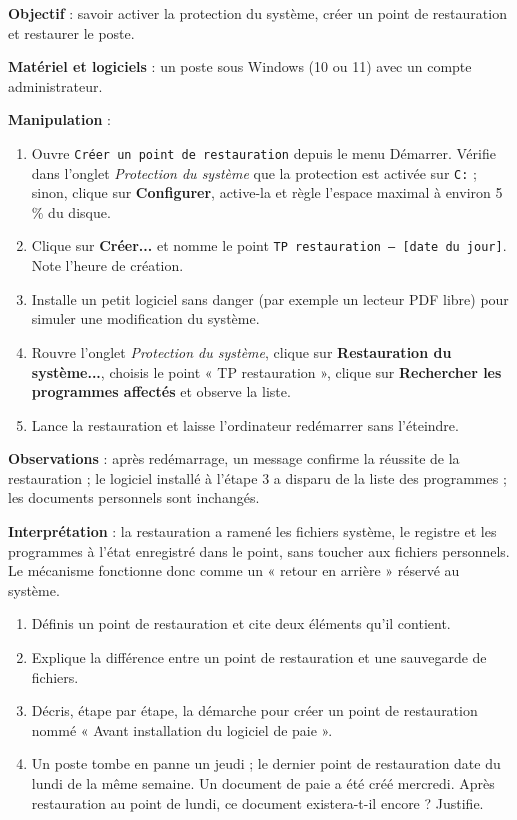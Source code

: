 \documentclass[11pt]{article}
\begin{document}
\begin{experience}
\textbf{Objectif} : savoir activer la protection du système, créer un point de restauration et restaurer le poste.\par
\textbf{Matériel et logiciels} : un poste sous Windows (10 ou 11) avec un compte administrateur.\par
\textbf{Manipulation} :
\begin{enumerate}
\item Ouvre \texttt{Créer un point de restauration} depuis le menu Démarrer. Vérifie dans l'onglet \emph{Protection du système} que la protection est activée sur \texttt{C:} ; sinon, clique sur \textbf{Configurer}, active-la et règle l'espace maximal à environ 5 \% du disque.
\item Clique sur \textbf{Créer...} et nomme le point \texttt{TP restauration -- [date du jour]}. Note l'heure de création.
\item Installe un petit logiciel sans danger (par exemple un lecteur PDF libre) pour simuler une modification du système.
\item Rouvre l'onglet \emph{Protection du système}, clique sur \textbf{Restauration du système...}, choisis le point « TP restauration », clique sur \textbf{Rechercher les programmes affectés} et observe la liste.
\item Lance la restauration et laisse l'ordinateur redémarrer sans l'éteindre.
\end{enumerate}
\textbf{Observations} : après redémarrage, un message confirme la réussite de la restauration ; le logiciel installé à l'étape 3 a disparu de la liste des programmes ; les documents personnels sont inchangés.\par
\textbf{Interprétation} : la restauration a ramené les fichiers système, le registre et les programmes à l'état enregistré dans le point, sans toucher aux fichiers personnels. Le mécanisme fonctionne donc comme un « retour en arrière » réservé au système.
\end{experience}

\begin{exercice}
\begin{enumerate}
\item Définis un point de restauration et cite deux éléments qu'il contient.
\item Explique la différence entre un point de restauration et une sauvegarde de fichiers.
\item Décris, étape par étape, la démarche pour créer un point de restauration nommé « Avant installation du logiciel de paie ».
\item Un poste tombe en panne un jeudi ; le dernier point de restauration date du lundi de la même semaine. Un document de paie a été créé mercredi. Après restauration au point de lundi, ce document existera-t-il encore ? Justifie.
\end{enumerate}
\end{exercice}
\end{document}
